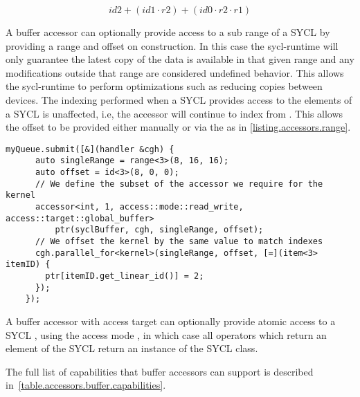 \begin{equation}
\label{row-major-equation-buffer}
 id2 + (id1 \cdot r2) + (id0 \cdot r2 \cdot r1)
\end{equation}

A buffer accessor can optionally provide access to a sub range of a SYCL
 by providing a range and offset on construction. In this
case the \gls{sycl-runtime} will only guarantee the latest copy of the data is
available in that given range and any modifications outside that range are
considered undefined behavior. This allows the \gls{sycl-runtime} to perform
optimizations such as reducing copies between devices. The indexing performed
when a SYCL  provides access to the elements of a SYCL
 is unaffected, i.e, the accessor will continue to index
from . This allows the offset to be provided either
manually or via the  as in
\ref{listing.accessors.range}.

\begin{lstlisting}[label=listing.accessors.range]
    myQueue.submit([&](handler &cgh) {
      auto singleRange = range<3>(8, 16, 16);
      auto offset = id<3>(8, 0, 0);
      // We define the subset of the accessor we require for the kernel
      accessor<int, 1, access::mode::read_write, access::target::global_buffer>
          ptr(syclBuffer, cgh, singleRange, offset);
      // We offset the kernel by the same value to match indexes
      cgh.parallel_for<kernel>(singleRange, offset, [=](item<3> itemID) {
        ptr[itemID.get_linear_id()] = 2;
      });
    });
\end{lstlisting}

A buffer accessor with access target 
can optionally provide atomic access to a SYCL , using the
access mode , in which case all operators which
return an element of the SYCL  return an instance of the SYCL
 class.

The full list of capabilities that buffer accessors can support is described
in~\ref{table.accessors.buffer.capabilities}.

